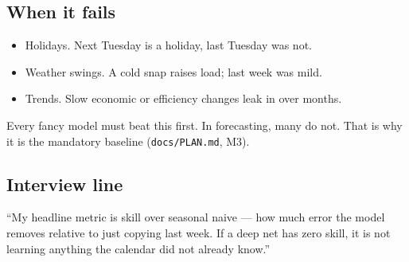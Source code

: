 \subsection{When it fails}

\begin{itemize}
  \item Holidays. Next Tuesday is a holiday, last Tuesday was not.
  \item Weather swings. A cold snap raises load; last week was mild.
  \item Trends. Slow economic or efficiency changes leak in over months.
\end{itemize}

Every fancy model must beat this first. In forecasting, many do not.
That is why it is the mandatory baseline (\texttt{docs/PLAN.md}, M3).

\subsection{Interview line}

``My headline metric is skill over seasonal naive --- how much error the model
removes relative to just copying last week. If a deep net has zero skill,
it is not learning anything the calendar did not already know.''
